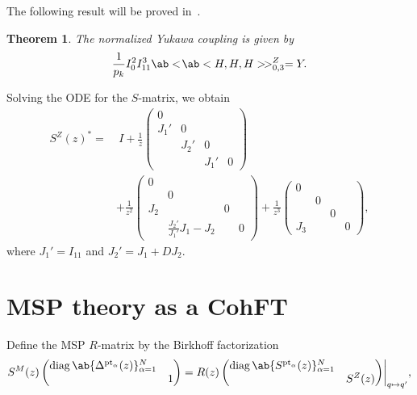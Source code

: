 \documentclass[10pt]{amsart}
\newtheorem{thm}{Theorem}[section]
\theoremstyle{definition}
\theoremstyle{remark}
\theoremstyle{plain}
\theoremstyle{definition}
\theoremstyle{remark}
\newcommand{\mr}[1]{\mathrm{#1}}
\newcommand{\on}[1]{\operatorname{#1}}
\newcommand{\1}{\mathbf{1}}
\newcommand{\2}{\mathbf{2}}
\newcommand{\3}{\mathbf{3}}
\newcommand{\pt}{\mr{pt}}
\numberwithin{equation}{section}
\begin{document}
The following result will be proved in~.
\begin{thm}\label{thm:yukawa}
  The normalized Yukawa coupling is given by
  \[ \frac{1}{p_k} I_0^2 I_{11}^3 \ab<\!\ab<H,H,H>\!>_{0,3}^{Z} = Y. \]
\end{thm}

Solving the ODE for the $S$-matrix, we obtain
\begin{align*}
  S^{Z}(z)^* =&{}\ I + \frac{1}{z} \begin{pmatrix}
    0 \\
    J_1' & 0 \\
           & J_2' & 0 \\
           & & J_1' & 0
  \end{pmatrix} \\ &+ \frac{1}{z^2} \begin{pmatrix}
    0 \\
    & 0 \\
    J_2 & & 0 \\
      & \frac{J_2'}{J_1'}J_1 - J_2 & &  0
  \end{pmatrix} + \frac{1}{z^3} \begin{pmatrix}
    0 \\
    & 0 \\
    & & 0 \\
    J_3 & & & 0
  \end{pmatrix},
\end{align*}
where $J_1' = I_{11}$ and $J_2' = J_1 + D J_2$.



\section{MSP theory as a CohFT}%
\label{sec:MSP theory as a CohFT}

Define the MSP $R$-matrix by the Birkhoff factorization
\begin{equation}\label{eqn:rmatrix}
    S^M(z) \begin{pmatrix}
    \on{diag}\ab\{ \Delta^{\pt_{\alpha}}(z)\}_{\alpha=1}^N & \\
    & 1
\end{pmatrix} = R(z) \begin{pmatrix}
    \on{diag}\ab\{ S^{\pt_{\alpha}}(z)\}_{\alpha=1}^N & \\
    & S^{Z}(z)
\end{pmatrix}\biggr|_{q \mapsto q'},
\end{equation}
\end{document}

